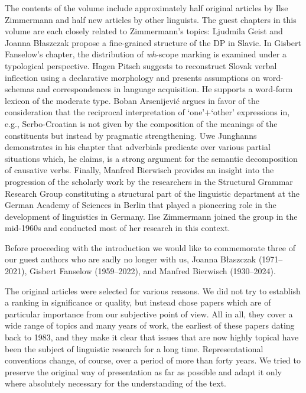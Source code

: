 \documentclass[output=paper,colorlinks,citecolor=brown]{langscibook}
\begin{document}
The contents of the volume include approximately half original articles by Ilse Zimmermann and half new articles by other linguists. The guest chapters in this volume are each closely related to Zimmermann's topics: Ljudmila Geist and Joanna Błaszczak propose a fine-grained structure of the DP in Slavic. In Gisbert Fanselow's chapter, the distribution of \textit{wh}-scope marking  is examined under a typological perspective. 
Hagen Pitsch suggests to reconstruct Slovak verbal inflection using a declarative morphology and presents assumptions on word-schemas and correspondences in language acquisition. He supports a word-form lexicon of the moderate type.
Boban Arsenijević argues in favor of the consideration that the reciprocal interpretation of `one'$+$`other' expressions in, e.g., Serbo-Croatian is not given by the composition of the meanings of the constituents but instead by pragmatic strengthening.
Uwe Junghanns demonstrates in his chapter that adverbials predicate over various partial situations which, he claims, is a strong argument for the semantic decomposition of causative verbs. 
Finally, Manfred Bierwisch provides an insight into the progression of the scholarly work by the researchers in the Structural Grammar Research Group constituting a structural part of the linguistic department at the German Academy of Sciences in Berlin that played a pioneering role in the development of linguistics in Germany. Ilse Zimmermann joined the group in the mid-1960s and conducted most of her research in this context. 

Before proceeding with the introduction we would like to commemorate three of our guest authors who are sadly no longer with us, Joanna Błaszczak (1971--2021), Gisbert Fanselow (1959--2022), and Manfred Bierwisch (1930--2024). 

The original articles were selected for various reasons. We did not try to establish a ranking in significance or quality, but instead chose papers which are of particular importance from our subjective point of view. All in all, they cover a wide range of topics and many years of work, the earliest of these papers dating back to 1983, and they make it clear that issues that are now highly topical have been the subject of linguistic research for a long time. Representational conventions change, of course, over a period of more than forty years. We tried to preserve the original way of presentation as far as possible and adapt it only where absolutely necessary for the understanding of the text.
\end{document}
